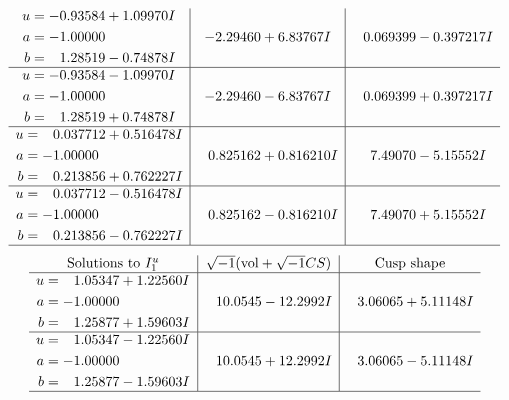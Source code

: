 \documentclass[1p]{elsarticle_modified}
\theoremstyle{definition}
\newcommand{\I}{\sqrt{-1}}
\begin{document}
$$\begin{array}{c|c|c}
\begin{aligned}
u &= -0.93584 + 1.09970 I \\
a &= -1.00000\phantom{ +0.000000I} \\
b &= \phantom{-}1.28519 - 0.74878 I\end{aligned}
 & -2.29460 + 6.83767 I & \phantom{-}0.069399 - 0.397217 I \\ \hline\begin{aligned}
u &= -0.93584 - 1.09970 I \\
a &= -1.00000\phantom{ +0.000000I} \\
b &= \phantom{-}1.28519 + 0.74878 I\end{aligned}
 & -2.29460 - 6.83767 I & \phantom{-}0.069399 + 0.397217 I \\ \hline\begin{aligned}
u &= \phantom{-}0.037712 + 0.516478 I \\
a &= -1.00000\phantom{ +0.000000I} \\
b &= \phantom{-}0.213856 + 0.762227 I\end{aligned}
 & \phantom{-}0.825162 + 0.816210 I & \phantom{-}7.49070 - 5.15552 I \\ \hline\begin{aligned}
u &= \phantom{-}0.037712 - 0.516478 I \\
a &= -1.00000\phantom{ +0.000000I} \\
b &= \phantom{-}0.213856 - 0.762227 I\end{aligned}
 & \phantom{-}0.825162 - 0.816210 I & \phantom{-}7.49070 + 5.15552 I\\
 \hline 
 \end{array}$$\newpage$$\begin{array}{c|c|c}  
\text{Solutions to }I^u_{1}& \I (\text{vol} + \sqrt{-1}CS) & \text{Cusp shape}\\
 \hline 
\begin{aligned}
u &= \phantom{-}1.05347 + 1.22560 I \\
a &= -1.00000\phantom{ +0.000000I} \\
b &= \phantom{-}1.25877 + 1.59603 I\end{aligned}
 & \phantom{-}10.0545 - 12.2992 I & \phantom{-}3.06065 + 5.11148 I \\ \hline\begin{aligned}
u &= \phantom{-}1.05347 - 1.22560 I \\
a &= -1.00000\phantom{ +0.000000I} \\
b &= \phantom{-}1.25877 - 1.59603 I\end{aligned}
 & \phantom{-}10.0545 + 12.2992 I & \phantom{-}3.06065 - 5.11148 I\\
 \hline 
 \end{array}$$\newpage\newpage\renewcommand{\arraystretch}{1}
\end{document}
